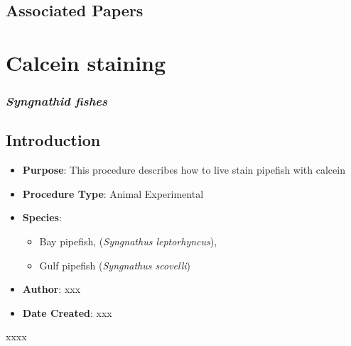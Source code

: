 \documentclass[
  letterpaper,
  DIV=11,
  numbers=noendperiod]{scrreprt}
\providecommand{\tightlist}{%
  \setlength{\itemsep}{0pt}\setlength{\parskip}{0pt}}\usepackage{longtable,booktabs,array}
\begin{document}
\hypertarget{associated-papers-40}{%
\section{Associated Papers}\label{associated-papers-40}}

\hypertarget{sec-vert_exp-Calcein}{%
\chapter{Calcein staining}\label{sec-vert_exp-Calcein}}

\hypertarget{syngnathid-fishes-1}{%
\subsection{\texorpdfstring{\emph{Syngnathid
fishes}}{Syngnathid fishes}}\label{syngnathid-fishes-1}}

\hypertarget{introduction-63}{%
\section{Introduction}\label{introduction-63}}

\begin{itemize}
\tightlist
\item
  \textbf{Purpose}: This procedure describes how to live stain pipefish
  with calcein
\item
  \textbf{Procedure Type}: Animal Experimental
\item
  \textbf{Species}:

  \begin{itemize}
  \tightlist
  \item
    Bay pipefish, (\emph{Syngnathus leptorhyncus}),
  \item
    Gulf pipefish (\emph{Syngnathus scovelli})
  \end{itemize}
\item
  \textbf{Author}: xxx
\item
  \textbf{Date Created}: xxx
\end{itemize}

\begin{tcolorbox}[enhanced jigsaw, rightrule=.15mm, title=\textcolor{quarto-callout-warning-color}{\faExclamationTriangle}\hspace{0.5em}{NOTES}, titlerule=0mm, opacitybacktitle=0.6, toprule=.15mm, bottomrule=.15mm, opacityback=0, left=2mm, colframe=quarto-callout-warning-color-frame, breakable, coltitle=black, colback=white, colbacktitle=quarto-callout-warning-color!10!white, bottomtitle=1mm, leftrule=.75mm, toptitle=1mm, arc=.35mm]

xxxx

\end{tcolorbox}
\end{document}
